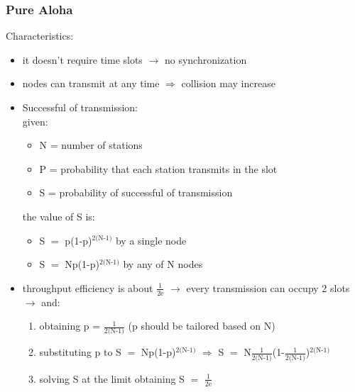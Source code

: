 \subsubsection{Pure Aloha}
Characteristics:
\begin{itemize}
    \item it doesn't require time slots $\rightarrow$ no synchronization
    \item nodes can transmit at any time $\Rightarrow$ collision may increase
    \item Successful of transmission:\\[0.2cm]given:
    \begin{itemize}
        \item N = number of stations
        \item P = probability that each station transmits in the slot
        \item S = probability of successful of transmission
    \end{itemize}
    the value of S is:
    \begin{itemize}
        \item S $=$ p(1-p)$^{\text{2(N-1)}}$ by a single node 
        \item S $=$ Np(1-p)$^{\text{2(N-1)}}$ by any of N nodes
    \end{itemize}
    \item throughput efficiency is about $\frac{\text{1}}{\text{2e}}$ $\rightarrow$ every
    transmission can occupy 2 slots\\ $\rightarrow$ and:
    \begin{enumerate}
        \item obtaining p = $\frac{\text{1}}{\text{2(N-1)}}$ (p should be tailored based on N)
        \item substituting p to S $=$ Np(1-p)$^{\text{2(N-1)}}$ $\Rightarrow$
        S $=$ N$\frac{\text{1}}{\text{2(N-1)}}$(1-$\frac{\text{1}}{\text{2(N-1)}}$)$^{\text{2(N-1)}}$
        \item solving S at the limit obtaining S $=$ $\frac{\text{1}}{\text{2e}}$
    \end{enumerate}
\end{itemize}

